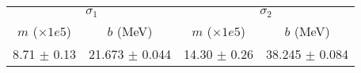\begin{tabular}{cc|cc}
\multicolumn{2}{c|}{$\sigma_1$} & \multicolumn{2}{|c}{$\sigma_2$} \\
$m$ ($\times1e5$) & $b$ (MeV) & $m$ ($\times1e5$) & $b$ (MeV) \\
\hline
8.71 $\pm$ 0.13 & 21.673 $\pm$ 0.044 & 14.30 $\pm$ 0.26 & 38.245 $\pm$ 0.084\\
\end{tabular}
